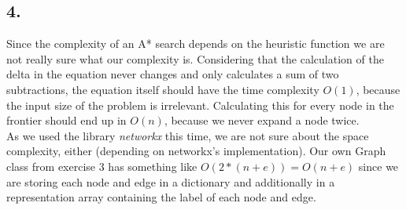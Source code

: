 \documentclass[10pt,a4paper]{article}
\begin{document}
			
		\subsection*{4.}
		
			Since the complexity of an A* search depends on the heuristic function we are not really sure what our complexity is. Considering that the calculation of the delta in the equation never changes and only calculates a sum of two subtractions, the equation itself should have the time complexity $O(1)$, because the input size of the problem is irrelevant. Calculating this for every node in the frontier should end up in $O(n)$, because we never expand a node twice. 
			\\
			As we used the library \textit{networkx} this time, we are not sure about the space complexity, either (depending on networkx's implementation). Our own Graph class from exercise 3 has something like $O(2*(n+e)) = O(n+e)$ since we are storing each node and edge in a dictionary and additionally in a representation array containing the label of each node and edge.
		
		
\end{document}
